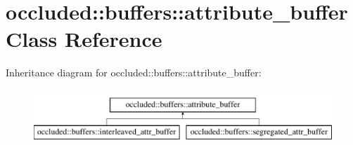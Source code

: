 \hypertarget{classoccluded_1_1buffers_1_1attribute__buffer}{\section{occluded\+:\+:buffers\+:\+:attribute\+\_\+buffer Class Reference}
\label{classoccluded_1_1buffers_1_1attribute__buffer}
}
Inheritance diagram for occluded\+:\+:buffers\+:\+:attribute\+\_\+buffer\+:\begin{figure}[H]
\begin{center}
\leavevmode
\includegraphics[height=2.000000cm]{classoccluded_1_1buffers_1_1attribute__buffer}
\end{center}
\end{figure}

